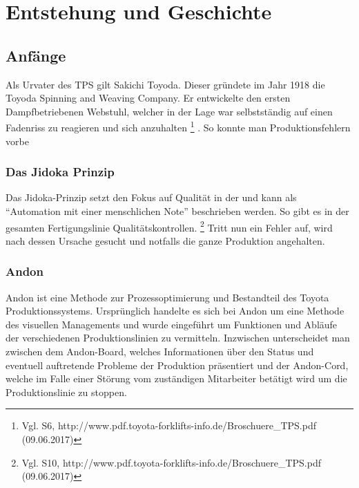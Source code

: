 \documentclass[00_ToyotaProduktionssystem.tex]{subfiles}
\begin{document}
\chapter{Entstehung und Geschichte}
\label{chap:ENTSTEHUNG}
\section{Anfänge}
Als Urvater des TPS gilt Sakichi Toyoda. Dieser gründete im Jahr 1918 die Toyoda Spinning and Weaving Company. Er entwickelte den ersten Dampfbetriebenen Webstuhl, welcher in der Lage war selbstständig auf einen Fadenriss zu reagieren und sich anzuhalten
\footnote{Vgl. S6,  http://www.pdf.toyota-forklifts-info.de/Broschuere\_TPS.pdf (09.06.2017)}
. So konnte man Produktionsfehlern vorbe%
\subsection{Das Jidoka Prinzip}
Das Jidoka-Prinzip setzt den Fokus auf Qualität in der  und kann als “Automation mit einer menschlichen Note” beschrieben werden. So gibt es in der gesamten Fertigungslinie Qualitätskontrollen. 
\footnote{Vgl. S10,  http://www.pdf.toyota-forklifts-info.de/Broschuere\_TPS.pdf (09.06.2017)}
 Tritt nun ein Fehler auf, wird nach dessen Ursache gesucht und notfalls die ganze Produktion angehalten.
\subsection{Andon}
Andon ist eine Methode zur Prozessoptimierung und Bestandteil des Toyota Produktionssystems. Ursprünglich handelte es sich bei Andon um eine Methode des visuellen Managements und wurde eingeführt um Funktionen und Abläufe der verschiedenen Produktionslinien zu vermitteln. Inzwischen unterscheidet man zwischen dem Andon-Board, welches Informationen über den Status und eventuell auftretende Probleme der Produktion präsentiert und der Andon-Cord, welche im Falle einer Störung vom zuständigen Mitarbeiter betätigt wird um die Produktionslinie zu stoppen.
\end{document}
